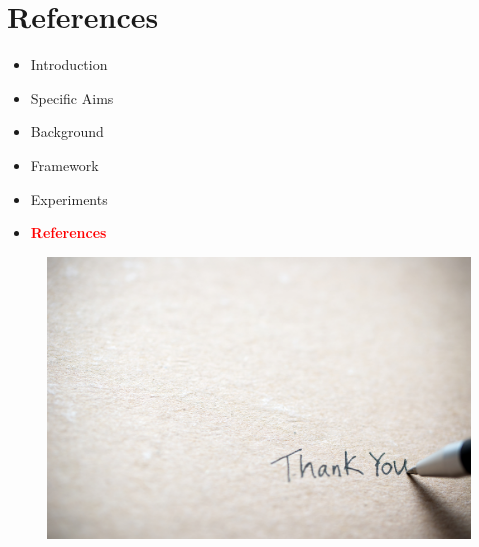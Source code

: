 \documentclass{beamer}
\begin{document}
\section{References}

\begin{frame}[noframenumbering]{}

\begin{itemize}
  \item Introduction
  \item Specific Aims
  \item Background
  \item Framework
  \item Experiments
  \item \textcolor{red}{\textbf{References}}
  
\end{itemize}

\end{frame}






\begin{frame}{}

\begin{center}
  \begin{figure}
\includegraphics[scale=0.25]{_img/hand-writing-thank-you-note-AMSC57F.jpg}
\end{figure}\label{fig:thankyou}
\vskip 1cm
\end{center}


\end{frame}
\end{document}
